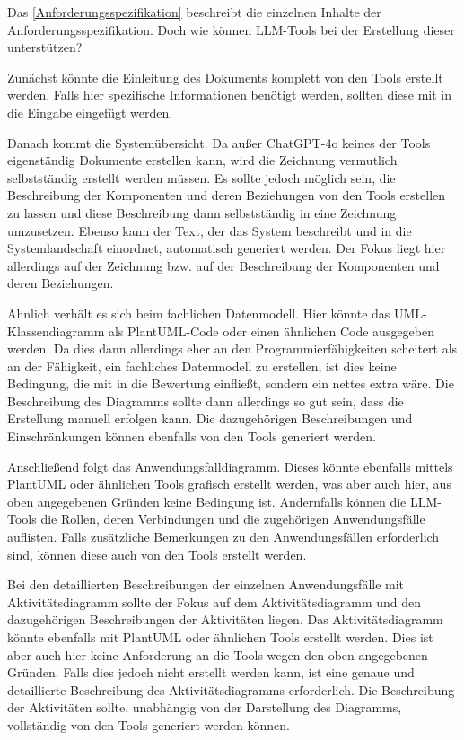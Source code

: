 Das \autoref{Anforderungsspezifikation} beschreibt die einzelnen Inhalte der Anforderungsspezifikation. Doch wie 
können LLM-Tools bei der Erstellung dieser unterstützen?

Zunächst könnte die Einleitung des Dokuments komplett von den Tools erstellt werden. Falls hier spezifische 
Informationen benötigt werden, sollten diese mit in die Eingabe eingefügt werden.

Danach kommt die Systemübersicht. Da außer ChatGPT-4o keines der Tools eigenständig Dokumente erstellen kann, 
wird die Zeichnung vermutlich selbstständig erstellt werden müssen. Es sollte jedoch möglich sein, die 
Beschreibung der Komponenten und deren 
Beziehungen von den Tools erstellen zu lassen und diese Beschreibung dann selbstständig in eine Zeichnung 
umzusetzen. Ebenso 
kann der Text, der das System beschreibt und in die Systemlandschaft einordnet, automatisch generiert werden. Der 
Fokus liegt hier allerdings auf der Zeichnung bzw. auf der Beschreibung der Komponenten und deren Beziehungen.

Ähnlich verhält es sich beim fachlichen Datenmodell. Hier könnte das UML-Klassendiagramm als 
PlantUML-Code oder einen ähnlichen Code ausgegeben werden. Da dies dann allerdings eher an den Programmierfähigkeiten 
scheitert als an der Fähigkeit, ein fachliches Datenmodell zu erstellen, ist dies keine Bedingung, die mit in die Bewertung 
einfließt, sondern ein nettes extra wäre. Die Beschreibung des Diagramms sollte dann allerdings so gut sein, dass die Erstellung 
manuell erfolgen kann. Die dazugehörigen Beschreibungen und Einschränkungen können ebenfalls von den Tools generiert werden.

Anschließend folgt das Anwendungsfalldiagramm. Dieses könnte ebenfalls mittels PlantUML oder ähnlichen Tools grafisch 
erstellt werden, was aber auch hier, aus oben angegebenen Gründen keine Bedingung ist. Andernfalls können 
die LLM-Tools die Rollen, deren Verbindungen und die zugehörigen Anwendungsfälle auflisten. Falls zusätzliche 
Bemerkungen zu den Anwendungsfällen erforderlich sind, können diese auch von den Tools erstellt werden.

Bei den detaillierten Beschreibungen der einzelnen Anwendungsfälle mit Aktivitätsdiagramm sollte der Fokus auf 
dem Aktivitätsdiagramm und den dazugehörigen Beschreibungen der Aktivitäten liegen. Das Aktivitätsdiagramm 
könnte ebenfalls mit PlantUML oder ähnlichen Tools erstellt werden. Dies ist aber auch hier keine Anforderung an 
die Tools wegen den oben angegebenen Gründen. Falls dies jedoch nicht erstellt werden kann, ist eine genaue 
und detaillierte Beschreibung des Aktivitätsdiagramms erforderlich. Die Beschreibung der Aktivitäten 
sollte, unabhängig von der Darstellung des Diagramms, vollständig von den Tools generiert werden können.

